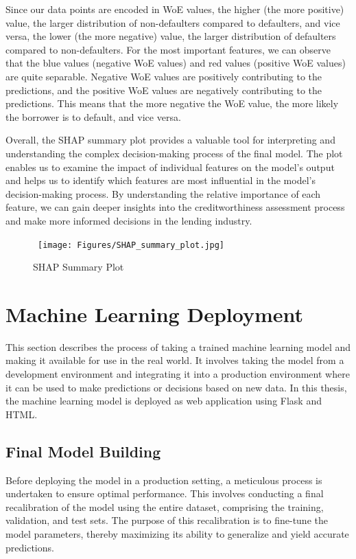         Since our data points are encoded in WoE values, the higher (the more positive) value, the larger distribution of non-defaulters compared to defaulters, and vice versa, the lower (the more negative) value, the larger distribution of defaulters compared to non-defaulters.
        For the most important features, we can observe that the blue values (negative WoE values) and red values (positive WoE values) are quite separable.
        Negative WoE values are positively contributing to the predictions, and the positive WoE values are negatively contributing to the predictions. This means that the more negative the WoE value, the more likely the borrower is to default, and vice versa.
        
        Overall, the SHAP summary plot provides a valuable tool for interpreting and understanding the complex decision-making process of the final model.
        The plot enables us to examine the impact of individual features on the model's output and helps us to identify which features are most influential in the model's decision-making process.
        By understanding the relative importance of each feature, we can gain deeper insights into the creditworthiness assessment process and make more informed decisions in the lending industry.
        
        \begin{figure}[H]
            \centering
            \caption{SHAP Summary Plot}\vspace{0.5em}
            \label{fig:shap}\
            \texttt{[image: Figures/SHAP\_summary\_plot.jpg]}
            \vspace{-1em}
        \end{figure}
        
        \section{Machine Learning Deployment}
        This section describes the process of taking a trained machine learning model and making it available for use in the real world. It involves taking the model from a development environment and integrating it into a production environment where it can be used to make predictions or decisions based on new data. In this thesis, the machine learning model is deployed as web application using Flask and HTML.
        \subsection{Final Model Building}
        Before deploying the model in a production setting, a meticulous process is undertaken to ensure optimal performance.
        This involves conducting a final recalibration of the model using the entire dataset, comprising the training, validation, and test sets.
        The purpose of this recalibration is to fine-tune the model parameters, thereby maximizing its ability to generalize and yield accurate predictions.
        
